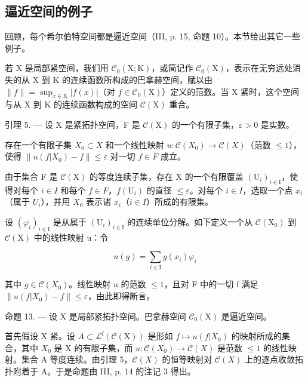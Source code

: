 \subsection{逼近空间的例子}

回顾，每个希尔伯特空间都是逼近空间（III, p. 15, 命题 10）。本节给出其它一些例子。

若 X 是局部紧空间，我们用 \(\mathcal{C}_{0}(\mathrm{X};\mathrm{K})\)，或简记作 \(\mathcal{C}_{0}(\mathrm{X})\)，表示在无穷远处消失的从 X 到 K 的连续函数所构成的巴拿赫空间，赋以由 \(\|f\|=\sup_{x\in\mathrm{X}}|f(x)|\)（对 \(f\in\mathcal{C}_{0}(\mathrm{X})\)）定义的范数。当 X 紧时，这个空间与从 X 到 K 的连续函数构成的空间 \(\mathcal{C}(\mathrm{X})\) 重合。

引理 5. --- 设 X 是紧拓扑空间，F 是 \(\mathcal{C}(\mathrm{X})\) 的一个有限子集，\(\varepsilon > 0\) 是实数。

存在一个有限子集 \(X_{0} \subset X\) 和一个线性映射 \(u: \mathcal{C}(X_{0}) \to \mathcal{C}(X)\)（范数 \(\leqslant 1\)），使得 \(\|u(f|X_{0}) - f\| \leqslant \varepsilon\) 对一切 \(f \in F\) 成立。

由于集合 F 是 \(\mathcal{C}(\mathrm{X})\) 的等度连续子集，存在 X 的一个有限覆盖 \((\mathrm{U}_{i})_{i\in\mathrm{I}}\)，使得对每个 \(i\in I\) 和每个 \(f\in F\)，\(f(\mathrm{U}_{i})\) 的直径 \(\leqslant\varepsilon\)。对每个 \(i\in I\)，选取一个点 \(x_{i}\)（属于 \(U_{i}\)），并用 \(X_{0}\) 表示诸 \(x_{i}\)（\(i\in I\)）所成的有限集。

设 \((\varphi_{i})_{i\in\mathrm{I}}\) 是从属于 \((\mathrm{U}_{i})_{i\in\mathrm{I}}\) 的连续单位分解。如下定义一个从 \(\mathcal{C}(\mathrm{X}_{0})\) 到 \(\mathcal{C}(\mathrm{X})\) 中的线性映射 u：令

\[
u (g) = \sum_ {i \in \mathrm{I}} g (x _ {i}) \varphi_ {i}
\]

其中 \(g \in \mathcal{C}(X_{0})\)。线性映射 u 的范数 \(\leqslant 1\)，且对 F 中的一切 f 满足 \(\|u(f|X_{0}) - f\| \leqslant \varepsilon\)，由此即得断言。

命题 13. --- 设 X 是局部紧拓扑空间。巴拿赫空间 \(\mathcal{C}_{0}(\mathrm{X})\) 是逼近空间。

首先假设 X 紧。设 \(A \subset \mathcal{L}^{\mathrm{f}}(\mathcal{C}(\mathrm{X}))\) 是形如 \(f \mapsto u(f|X_{0})\) 的映射所成的集合，其中 \(X_{0}\) 是 X 的有限子集，而 \(u : \mathcal{C}(X_{0}) \to \mathcal{C}(X)\) 是范数 \(\leqslant 1\) 的线性映射。集合 A 等度连续。由引理 5，\(\mathcal{C}(X)\) 的恒等映射对 \(\mathcal{C}(X)\) 上的逐点收敛拓扑附着于 A。于是命题由 III, p. 14 的注记 3 得出。

